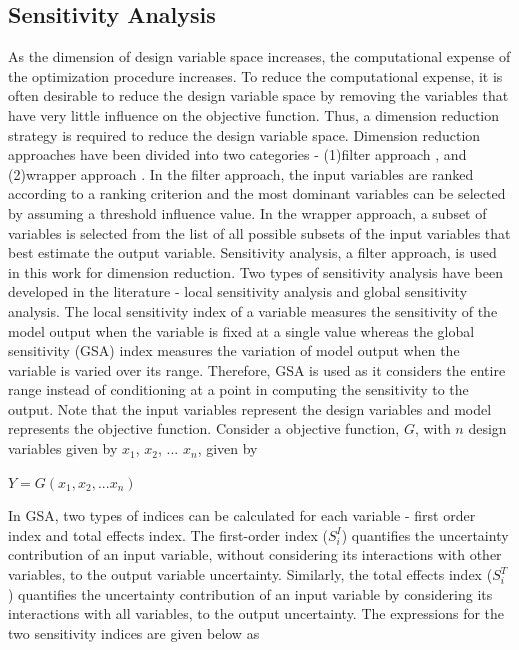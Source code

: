 \documentclass[10pt]{article}
\begin{document}
\subsection{Sensitivity Analysis}
\label{subsec:Sensitivity}
\hspace{5 mm} As the dimension of design variable space increases, the computational expense of the optimization procedure increases. To reduce the computational expense, it is often desirable to reduce the design variable space by removing the variables that have very little influence on the objective function. Thus, a dimension reduction strategy is required to reduce the design variable space. Dimension reduction approaches have been divided into two categories - (1)filter approach \cite{Bioinformatics}, and (2)wrapper approach \cite{Wrappers}. In the filter approach, the input variables are ranked according to a ranking criterion and the most dominant variables can be selected by assuming a threshold influence value. In the wrapper approach, a subset of variables is selected from the list of all possible subsets of the input variables that best estimate the output variable. Sensitivity analysis, a filter approach, is used in this work for dimension reduction. Two types of sensitivity analysis have been developed in the literature - local sensitivity analysis and global sensitivity analysis. The local sensitivity index of a variable measures the sensitivity of the model output when the variable is fixed at a single value whereas the global sensitivity (GSA)\cite{Global} index measures the variation of model output when the variable is varied over its range. Therefore, GSA is used as it considers the entire range instead of conditioning at a point in computing the sensitivity to the output. Note that the input variables represent the design variables and model represents the objective function.
Consider a objective function, $G$, with $n$ design variables given by $x_{1}$, $x_{2}$, ...  $x_{n}$, given by

\centerline{$Y = G(x_{1}, x_{2}, ... x_{n})$}

In GSA, two types of indices can be calculated for each variable - first order index and total effects index. The first-order index ($S_{i}^{I}$) quantifies the uncertainty contribution of an input variable, without considering its interactions with other variables, to the output variable uncertainty. Similarly, the total effects index ($S_{i}^{T}$) quantifies the uncertainty contribution of an input variable by considering its interactions with all variables, to the output uncertainty. The expressions for the two sensitivity indices are given below as 
\end{document}
